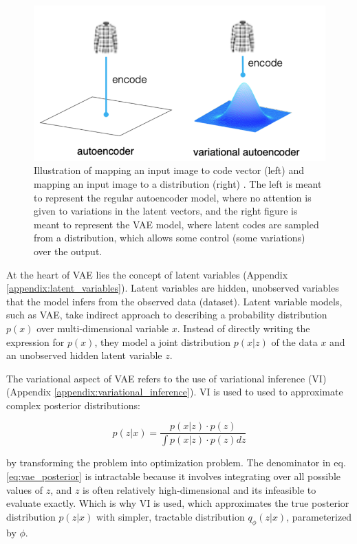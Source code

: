 \begin{figure}[h]
    \centering
    \includegraphics[scale=0.4]{images/autoencoder-vs-variational-autoencoder-point-vs-distribution-768x409.png}
    \caption{Illustration of mapping an input image to code vector (left) and mapping an input image to a distribution (right) \cite{ae_vs_vae}. The left is meant to represent the regular autoencoder model, where no attention is given to variations in the latent vectors, and the right figure is meant to represent the VAE model, where latent codes are sampled from a distribution, which allows some control (some variations) over the output.}
    \label{fig:ae_vs_vae}
\end{figure}

At the heart of VAE lies the concept of latent variables (Appendix \ref{appendix:latent_variables}). Latent variables are hidden, unobserved variables that the model infers from the observed data (dataset). Latent variable models, such as VAE, take indirect approach to describing a probability distribution $p(x)$ over multi-dimensional variable $x$. Instead of directly writing the expression for $p(x)$, they model a joint distribution $p(x|z)$ of the data $x$ and an unobserved hidden latent variable $z$.

The variational aspect of VAE refers to the use of variational inference (VI) (Appendix \ref{appendix:variational_inference}). VI is used to used to approximate complex posterior distributions: 

\begin{equation}
p(z|x) = \frac{p(x|z) \cdot p(z)}{\int p(x|z) \cdot p(z) dz}
\label{eq:vae_posterior}
\end{equation}

by transforming the problem into optimization problem. The denominator in eq. \ref{eq:vae_posterior} is intractable because it involves integrating over all possible values of $z$, and $z$ is often relatively high-dimensional and its infeasible to evaluate exactly. Which is why VI is used, which approximates the true posterior distribution $p(z|x)$ with simpler, tractable distribution $q_\phi (z|x)$, parameterized by $\phi$.

